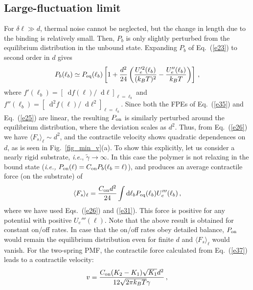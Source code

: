 \documentclass[twocolumn,prl,english]{revtex4-1}
\newcommand*\diff{\mathop{}\!\mathrm{d}}
\begin{document}
\subsection{Large-fluctuation limit} 
For $\delta \ell \gg d$, thermal noise cannot be neglected, but the change in length due to the binding is relatively small. Then, $P_b$ is only slightly perturbed from the equilibrium distribution in the unbound state. Expanding $P_b$ of Eq.~(\ref{e23}) to second order in $d$ gives
\begin{align}
P_b(\ell_b)\simeq
P_{\rm eq}(\ell_b)\left[1+\frac{d^2}{24}\left(\frac{U_e'^2(\ell_b)}{(k_BT)^2}-\frac{U_e''(\ell_b)}{k_B T}\right)\right]\,,\label{e31}
\end{align}
where $f'(\ell_b)=[\diff f(\ell) /\diff \ell]_{\ell=\ell_b}$ and $f''(\ell_b)=[\diff^2 f(\ell) /\diff \ell^2]_{\ell=\ell_b}$. Since both the FPEs of Eq.~(\ref{e35}) and Eq.~(\ref{e25}) are linear, the resulting $P_{\rm on}$ is similarly perturbed around the equilibrium distribution, where the deviation scales as $d^2$. Thus, from  Eq.~(\ref{e26}) we have $\langle F_s \rangle_\ell \sim d^2$, and the contractile velocity shows quadratic dependences on $d$, as is seen in Fig.~\ref{fig_min_v}(a). To show this explicitly, let us consider a nearly rigid substrate, {\it i.e.}, $ \tilde \gamma \rightarrow \infty$. 
In this case the polymer is not relaxing in the bound state ({\it i.e.,} $P_{\rm on}(\ell) = C_{\rm on} P_b(\ell_b=\ell)$), and produces an average contractile force (on the substrate) of
%
\begin{align}
\langle F_s \rangle_\ell =\frac{C_{\rm on}d^2}{24}\int \diff \ell_b P_{\rm eq}(\ell_b)U_e'''(\ell_b) \, ,
\label{e37}
\end{align}
%
where we have used Eqs.~(\ref{e26}) and (\ref{e31}). This force is positive for any potential with positive $U_e'''(\ell)$. 
Note that the above result is obtained for constant on/off rates. 
In case that the on/off rates obey detailed balance,  $P_{\rm on}$ would remain the equilibrium distribution even for finite $d$ and $\langle F_s \rangle_\ell$ would vanish. For the two-spring PMF, the contractile force calculated from Eq.~(\ref{e37}) leads to a contractile velocity:
\begin{align}
v =\frac{C_{\rm on}(K_2-K_1)\sqrt{K_1}d^2}{12\sqrt{2\pi k_B T}\gamma} \, ,
\label{e38}
\end{align}
\end{document}
